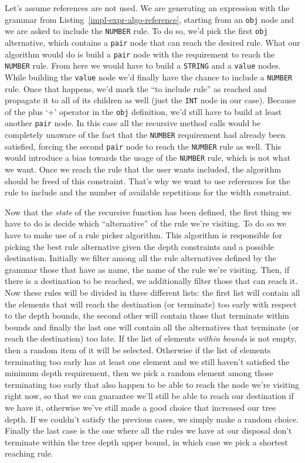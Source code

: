 \documentclass[]{usiinfbachelorproject}
\begin{document}
Let's assume references are not used. We are generating an expression with the
grammar from Listing~\ref{impl-expr-algo-reference}, starting from an
\texttt{obj} node and we are asked to include the \texttt{NUMBER} rule.
To do so, we'd pick the first \texttt{obj} alternative, which contains a
\texttt{pair} node that can reach the desired rule. What our algorithm would do
is build a \texttt{pair} node with the requirement to reach the \texttt{NUMBER}
rule.
From here we would have to build a \texttt{STRING} and a \texttt{value}
nodes. While building the \texttt{value} node we'd finally have the chance to
include a \texttt{NUMBER} rule. Once that happens, we'd mark the ``to include
rule'' as reached and propagate it to all of its children as well (just
the \texttt{INT} node in our case).
Because of the plus `+' operator in the \texttt{obj} definition, we'd still have
to build at least another \texttt{pair} node. In this case all the recursive
method calls would be completely unaware of the fact that the \texttt{NUMBER}
requirement had already been satisfied, forcing the second \texttt{pair}
node to reach the \texttt{NUMBER} rule as well.
This would introduce a bias towards the usage of the \texttt{NUMBER} rule,
which is not what we want. Once we reach the rule that the user wants included,
the algorithm should be freed of this constraint.
That's why we want to use references for the rule to include and the number of
available repetitions for the width constraint.

Now that the \textit{state} of the recursive function has been defined, the
first thing we have to do is decide which ``alternative'' of the rule we're
visiting. To do so we have to make use of a rule picker algorithm.
This algorithm is responsible for picking the best rule alternative given
the depth constraints and a possible destination.
Initially we filter among all the rule alternatives defined by the grammar
those that have as name, the name of the rule we're visiting. Then, if there
is a destination to be reached, we additionally filter those that can reach it.
Now these rules will be divided in three different lists: the first list will
contain all the elements that will reach the destination (or terminate) too
early with respect to the depth bounds, the second other will contain those
that terminate within bounds and finally the last one will contain all the
alternatives that terminate (or reach the destination) too late.
If the list of elements \textit{within bounds} is not empty, then a random
item of it will be selected. Otherwise if the list of elements terminating too
early has at least one element and we still haven't satisfied the minimum
depth requirement, then we pick a random element among those terminating too
early that also happen to be able to reach the node we're visiting right now,
so that we can guarantee we'll still be able to reach our destination if
we have it, otherwise we've still made a good choice that increased our
tree depth. If we couldn't satisfy the previous cases, we simply make a random
choice. Finally the last case is the one where all the rules we have at our
disposal don't terminate within the tree depth upper bound, in which case
we pick a shortest reaching rule.
\end{document}
